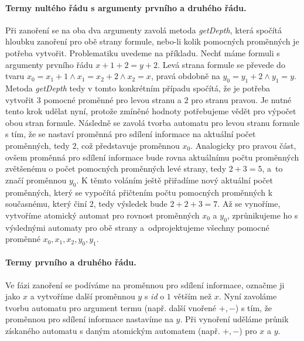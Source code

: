 \paragraph{Termy nultého řádu s argumenty prvního a druhého řádu.} Při zanoření se na oba dva argumenty zavolá metoda \textit{getDepth}, která spočítá hloubku zanoření pro obě strany formule, nebo-li kolik pomocných proměnných je potřeba vytvořit. Problematiku uvedeme na příkladu. Nechť máme formuli s argumenty prvního řádu $x+1+2=y+2$. Levá strana formule se převede do tvaru $ x_0 = x_1 + 1 \wedge x_1 = x_2 + 2 \wedge x_2 = x $, pravá obdobně na $ y_0 = y_1 + 2 \wedge y_1 = y $. Metoda \textit{getDepth} tedy v tomto konkrétním případu spočítá, že je potřeba vytvořit $3$ pomocné proměnné pro levou stranu a $2$ pro stranu pravou. Je nutné tento krok udělat nyní, protože zmíněné hodnoty potřebujeme vědět pro výpočet obou stran formule. Následně se zavolá tvorba automatu pro levou stranu formule s tím, že se nastaví proměnná pro sdílení informace na aktuální počet proměnných, tedy $2$, což představuje proměnnou $x_0$. Analogicky pro pravou část, ovšem proměnná pro sdílení informace bude rovna aktuálnímu počtu proměnných zvětšenému o počet pomocných proměnných levé strany, tedy $2+3=5$, a~to značí proměnnou $y_0$. K těmto voláním ještě přiřadíme nový aktuální počet proměnných, který se vypočítá přičtením počtu pomocných proměnných k současnému, který činí $2$, tedy výsledek bude $2+2+3=7$. Až se vynoříme, vytvoříme atomický automat pro rovnost proměnných $x_0$ a $y_0$, zprůnikujeme ho s výslednými automaty pro obě strany a~odprojektujeme všechny pomocné proměnné $x_0,x_1,x_2,y_0,y_1$.

\paragraph{Termy prvního a druhého řádu.} Ve fázi zanoření se podíváme na proměnnou pro sdílení informace, označme ji jako $x$ a vytvoříme další proměnnou $y$ s \textit{id} o $1$ větším než $x$. Nyní zavoláme tvorbu automatu pro argument termu (např. další vnořené $+,-$) s tím, že proměnnou pro sdílení informace nastavíme na $y$. Při vynoření uděláme průnik získaného automatu s daným atomickým automatem (např. $+,-$) pro $x$ a $y$.

